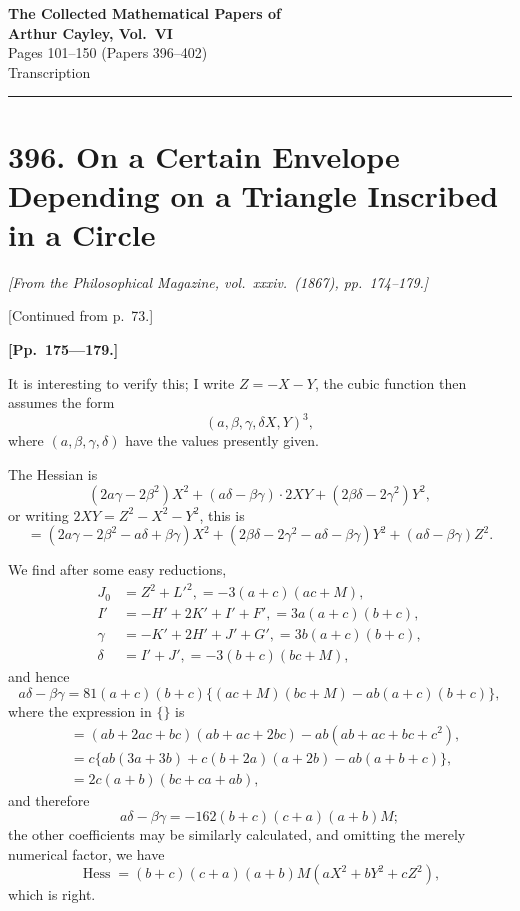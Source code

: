 \documentclass[11pt,a4paper]{article}
\theoremstyle{definition}
\DeclareMathOperator{\Hess}{Hess}
\newcommand{\Hessian}{\Hess}
\begin{document}
\begin{center}
{\Large\bfseries The Collected Mathematical Papers of\\[4pt] Arthur Cayley, Vol.\ VI}\\[12pt]
{\large Pages 101--150 (Papers 396--402)}\\[8pt]
{\normalsize Transcription}
\end{center}

\vspace{1em}
\hrule
\vspace{1.5em}


\section*{396. On a Certain Envelope Depending on a Triangle Inscribed in a Circle}

\begin{flushright}
\textit{[From the Philosophical Magazine, vol.\ xxxiv.\ (1867), pp.~174--179.]}
\end{flushright}

\vspace{0.5em}

[Continued from p.~73.]

\bigskip

\noindent\textbf{[Pp.~175---179.]}

It is interesting to verify this; I write $Z = -X-Y$, the cubic function then assumes the form
\[
(a, \beta, \gamma, \delta  X, Y)^3,
\]
where $(a, \beta, \gamma, \delta)$ have the values presently given.

The Hessian is
\[
(2a\gamma - 2\beta^2)X^2 + (a\delta - \beta\gamma) \cdot 2XY + (2\beta\delta - 2\gamma^2)Y^2,
\]
or writing $2XY = Z^2 - X^2 - Y^2$, this is
\[
= (2a\gamma - 2\beta^2 - a\delta + \beta\gamma)X^2 + (2\beta\delta - 2\gamma^2 - a\delta - \beta\gamma)Y^2 + (a\delta - \beta\gamma)Z^2.
\]

We find after some easy reductions,
\begin{align*}
J_0 &= Z^2 + L'^2, = -3(a+c)(ac+M),\\
I' &= -H' + 2K' + I' + F', = 3a(a+c)(b+c),\\
\gamma &= -K' + 2H' + J' + G', = 3b(a+c)(b+c),\\
\delta &= I' + J', = -3(b+c)(bc+M),
\end{align*}
and hence
\[
a\delta - \beta\gamma = 81(a+c)(b+c)\{(ac+M)(bc+M) - ab(a+c)(b+c)\},
\]
where the expression in $\{\}$ is
\begin{align*}
&= (ab + 2ac + bc)(ab + ac + 2bc) - ab(ab + ac + bc + c^2),\\
&= c\{ab(3a+3b) + c(b+2a)(a+2b) - ab(a+b+c)\},\\
&= 2c(a+b)(bc+ca+ab),
\end{align*}
and therefore
\[
a\delta - \beta\gamma = -162(b+c)(c+a)(a+b)M;
\]
the other coefficients may be similarly calculated, and omitting the merely numerical factor, we have
\[
\Hessian = (b+c)(c+a)(a+b)M(aX^2 + bY^2 + cZ^2),
\]
which is right.
\end{document}
